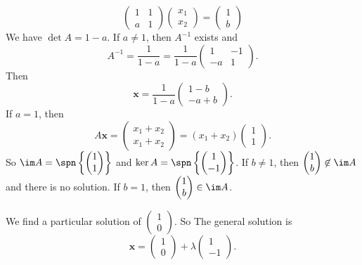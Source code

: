 \documentclass[a4paper]{article}
\begin{document}
\begin{eg}
  \[
    \begin{pmatrix}
      1 & 1\\
      a & 1
    \end{pmatrix}
    \begin{pmatrix}
      x_1\\
      x_2
    \end{pmatrix} =
    \begin{pmatrix}
      1\\
      b
    \end{pmatrix}
  \]
  We have $\det A = 1 - a$. If $a \not= 1$, then $A^{-1}$ exists and
  \[
    A^{-1} = \frac{1}{1 - a} = \frac{1}{1 - a}\begin{pmatrix}
      1 & -1\\
      -a & 1
    \end{pmatrix}.
  \]
  Then
  \[
    \mathbf{x} = \frac{1}{1- a}\begin{pmatrix}
      1 - b\\
      -a + b
    \end{pmatrix}.
  \]
  If $a = 1$, then
  \[
    A\mathbf{x} = \begin{pmatrix}
      x_1 + x_2\\
      x_1 + x_2
    \end{pmatrix} = (x_1 + x_2)\begin{pmatrix}
      1\\
      1
    \end{pmatrix}.
  \]
  So $\im A = \spn\left\{
    \begin{pmatrix}
      1\\1
    \end{pmatrix}
  \right\}$ and $\ker A = \spn\left\{
    \begin{pmatrix}
      1\\-1
    \end{pmatrix}
  \right\}$. If $b \not=1 $, then $\begin{pmatrix}
    1\\b
  \end{pmatrix}
  \not\in \im A$ and there is no solution. If $b = 1$, then $
  \begin{pmatrix}
    1\\b
  \end{pmatrix}
  \in \im A$.

  We find a particular solution of
  $\begin{pmatrix}
    1\\
    0
  \end{pmatrix}$. So The general solution is
  \[
    \mathbf{x} =
    \begin{pmatrix}
      1\\0
    \end{pmatrix}
    + \lambda
    \begin{pmatrix}
      1\\-1
    \end{pmatrix}.
  \]
\end{eg}
\end{document}
